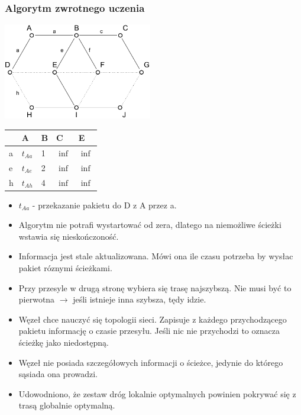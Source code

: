 			\subsubsection{Algorytm zwrotnego uczenia}
				\includegraphics[width=6.5cm]{./images/image37.pdf}
				\begin{tabular}{l|l|l|l|l}
         & A          & B & C        & E                             \\ \hline
					a            & $ t_{Aa} $ & 1 & $ \inf $ & \multicolumn{1}{l|}{$ \inf $} \\ \hline
					e            & $ t_{Ae} $ & 2 & $ \inf $ & \multicolumn{1}{l|}{$ \inf $} \\ \hline
					h            & $ t_{Ah} $ & 4 & $ \inf $ & \multicolumn{1}{l|}{$ \inf $} \\ \cline{2-5} 
				\end{tabular}
				\begin{itemize}
					\item $ t_{Aa} $ - przekazanie pakietu do D z A przez a.
					\item Algorytm nie potrafi wystartować od zera, dlatego na niemożliwe ścieżki wstawia się nieskończoność.
					\item Informacja jest stale aktualizowana. Mówi ona ile czasu potrzeba by wysłac pakiet róznymi ścieżkami.
					\item Przy przesyle w drugą stronę wybiera się trasę najszybszą. Nie musi być to pierwotna $ \rightarrow $ jeśli istnieje inna szybsza, tędy idzie.
					\item Węzeł chce nauczyć się topologii sieci. Zapisuje z każdego przychodzącego pakietu informację o czasie przesyłu. Jeśli nic nie przychodzi to oznacza ścieżkę jako niedostępną.
					\item Węzeł nie posiada szczegółowych informacji o ścieżce, jedynie do którego sąsiada ona prowadzi.
					\item Udowodniono, że zestaw dróg lokalnie optymalnych powinien pokrywać się z trasą globalnie optymalną.
				\end{itemize}
